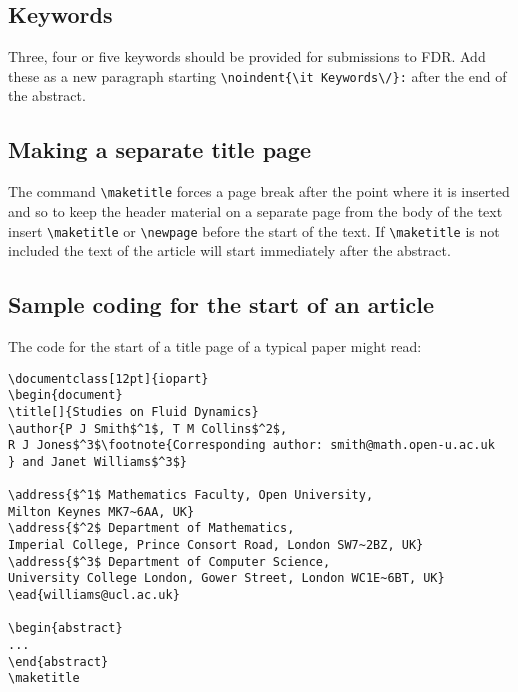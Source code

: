 \documentclass[12pt]{iopart}
\begin{document}
\subsection{Keywords}
Three, four or five keywords should be provided for submissions to FDR. Add these as a new paragraph starting \verb"\noindent{\it Keywords\/}:" after the end of the abstract.

\subsection{Making a separate title page}
The command \verb"\maketitle" forces a page break after the point where it
is inserted and so to keep the header material on a separate page from the
body of the text insert \verb"\maketitle" or \verb"\newpage" before the start of the text. 
If \verb"\maketitle" is not included the text of the
article will start immediately after the abstract.  

\subsection{Sample coding for the start of an article}
\label{startsample}
The code for the start of a title page of a typical paper might read:
\small\begin{verbatim}
\documentclass[12pt]{iopart}
\begin{document}
\title[]{Studies on Fluid Dynamics}
\author{P J Smith$^1$, T M Collins$^2$, 
R J Jones$^3$\footnote{Corresponding author: smith@math.open-u.ac.uk
} and Janet Williams$^3$}

\address{$^1$ Mathematics Faculty, Open University, 
Milton Keynes MK7~6AA, UK}
\address{$^2$ Department of Mathematics, 
Imperial College, Prince Consort Road, London SW7~2BZ, UK}
\address{$^3$ Department of Computer Science, 
University College London, Gower Street, London WC1E~6BT, UK}
\ead{williams@ucl.ac.uk}

\begin{abstract}
...
\end{abstract}
\maketitle
\end{verbatim}
\normalsize
\end{document}

